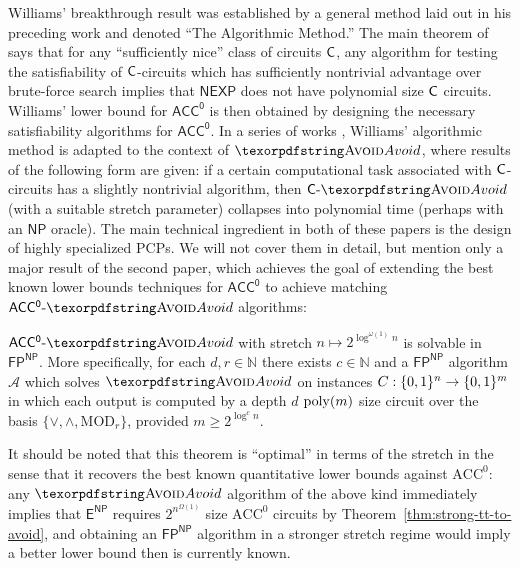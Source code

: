 Williams' breakthrough result was established by a general method laid out in his preceding work \cite{sat-lb} and denoted ``The Algorithmic Method.'' The main theorem of \cite{sat-lb} says that for any ``sufficiently nice'' class of circuits $\cl{C}$, any algorithm for testing the satisfiability of $\cl{C}$-circuits which has sufficiently nontrivial advantage over brute-force search implies that $\mathsf{NEXP}$ does not have polynomial size $\cl{C}$ circuits. Williams' lower bound for $\mathsf{ACC^0}$ is then obtained by designing the necessary satisfiability algorithms for $\mathsf{ACC^0}$.
In a series of works \cite{RSW,hard-partial}, Williams' algorithmic method is adapted to the context of $\avoid$, where results of the following form are given: if a certain computational task associated with $\cl{C}$-circuits has a slightly nontrivial algorithm, then $\cl{C}\dash\avoid$ (with a suitable stretch parameter) collapses into polynomial time (perhaps with an $\mathsf{NP}$ oracle). 
The main technical ingredient in both of these papers is the design of highly specialized PCPs. We will not cover them in detail, but mention only a major result of the second paper, which achieves the goal of extending the best known lower bounds techniques for $\mathsf{ACC^0}$ to achieve matching $\cl{ACC^0}\dash\avoid$ algorithms:
\begin{theorem}
$\mathsf{ACC^0}\dash \avoid$ with stretch $n \mapsto 2^{\log^{\omega(1)}n}$ is solvable in $\mathsf{FP^{NP}}$. More specifically, for each $d,r \in \mathbb{N}$ there exists $c \in \mathbb{N}$ and a $\mathsf{FP^{NP}}$ algorithm $\mathcal{A}$ which solves $\avoid$ on instances $C: \{0,1\}^n \to \{0,1\}^m$ in which each output is computed by a depth $d$ $\mathrm{poly}(m)$ size circuit over the basis $\{\lor, \land, \mathrm{MOD}_r\}$, provided $m \geq 2^{\log^cn}$.
\end{theorem}

It should be noted that this theorem is ``optimal'' in terms of the stretch in the sense that it recovers the best known quantitative lower bounds against $\mathrm{ACC^0}$: any $\avoid$ algorithm of the above kind immediately implies that $\mathsf{E^{NP}}$ requires $2^{n^{\Omega(1)}}$ size $\mathrm{ACC^0}$ circuits by Theorem~\ref{thm:strong-tt-to-avoid}, and obtaining an $\mathsf{FP^{NP}}$ algorithm in a stronger stretch regime would imply a better lower bound then is currently known.
